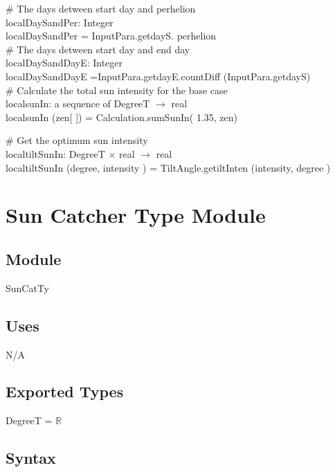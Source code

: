 \documentclass[12pt, titlepage]{article}
\begin{document}
$\#$ The days detween start day and perhelion\\
localDaySandPer: Integer\\
localDaySandPer = InputPara.getdayS. perhelion\\

$\#$ The days detween start day and end day\\
localDaySandDayE: Integer\\
localDaySandDayE =InputPara.getdayE.countDiff (InputPara.getdayS)\\

$\#$ Calculate the total sun intensity for the base case\\
localsunIn: a sequence of DegreeT $\rightarrow$ real\\
localsunIn (zen[ ]) = Calculation.sumSunIn( 1.35, zen)

$\#$ Get the optimum sun intensity\\
localtiltSunIn: DegreeT $\times$ real $\rightarrow$ real\\
localtiltSunIn (degree, intensity ) = TiltAngle.getiltInten (intensity, degree )




\newpage

\section{Sun Catcher Type Module} \label{ModuleSCTM} 

\subsection{Module}
SunCatTy

\subsection{Uses}

N/A\\

\subsection{Exported Types}

DegreeT = $\mathbb{R}$\\

\subsection{Syntax}
\end{document}
